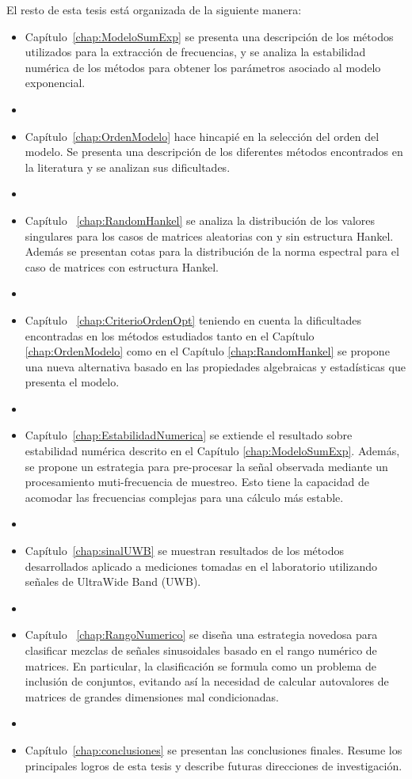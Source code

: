 El resto de esta tesis está organizada de la siguiente manera:

\begin{itemize}
	\item Capítulo~\ref{chap:ModeloSumExp} se presenta una descripción de los métodos utilizados para la extracción de frecuencias, y se analiza la estabilidad numérica de los métodos para obtener los parámetros asociado al modelo exponencial. 
	\item[] 
	\item Capítulo~\ref{chap:OrdenModelo} hace hincapié en la selección del orden del modelo. Se presenta una descripción de los diferentes métodos encontrados en la literatura y se analizan sus dificultades. 
	\item[] 
    \item Capítulo ~\ref{chap:RandomHankel} se analiza la distribución de los valores singulares para los casos de matrices aleatorias con y sin estructura Hankel. Además se presentan cotas para la distribución de la norma espectral para el caso de matrices con estructura Hankel. 
    \item[]
	\item Capítulo ~\ref{chap:CriterioOrdenOpt} teniendo en cuenta la dificultades encontradas en los métodos estudiados tanto en el Capítulo \ref{chap:OrdenModelo} como en el Capítulo \ref{chap:RandomHankel} se propone una nueva alternativa basado en las propiedades algebraicas y estadísticas que presenta el modelo.
	\item[] 
	\item Capítulo~\ref{chap:EstabilidadNumerica} se extiende el resultado sobre estabilidad numérica descrito en el Capítulo \ref{chap:ModeloSumExp}. Además, se propone un estrategia para pre-procesar la señal observada mediante un procesamiento muti-frecuencia de muestreo. Esto tiene la capacidad de acomodar las frecuencias complejas para una cálculo más estable.
	\item[] 
	\item Capítulo~\ref{chap:sinalUWB} se muestran resultados de los métodos desarrollados aplicado a mediciones tomadas en el laboratorio utilizando señales de UltraWide Band (UWB).
	\item[] 
	\item Capítulo ~\ref{chap:RangoNumerico} se diseña una estrategia novedosa para clasificar mezclas de señales sinusoidales basado en el rango numérico de matrices. En particular, la clasificación se formula como un problema de inclusión de conjuntos, evitando así la necesidad de calcular autovalores de matrices de grandes dimensiones mal condicionadas.
	\item[]
	\item Capítulo~\ref{chap:conclusiones} se presentan las conclusiones finales. Resume los principales logros de esta tesis y describe futuras direcciones de investigación.
\end{itemize}

